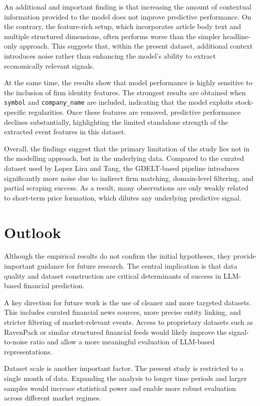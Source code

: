 An additional and important finding is that increasing the amount of contextual information provided to the model does not improve predictive performance. On the contrary, the feature-rich setup, which incorporates article body text and multiple structured dimensions, often performs worse than the simpler headline-only approach. This suggests that, within the present dataset, additional context introduces noise rather than enhancing the model’s ability to extract economically relevant signals.

At the same time, the results show that model performance is highly sensitive to the inclusion of firm identity features. The strongest results are obtained when \texttt{symbol} and \texttt{company\_name} are included, indicating that the model exploits stock-specific regularities. Once these features are removed, predictive performance declines substantially, highlighting the limited standalone strength of the extracted event features in this dataset.

Overall, the findings suggest that the primary limitation of the study lies not in the modelling approach, but in the underlying data. Compared to the curated dataset used by Lopez Lira and Tang, the GDELT-based pipeline introduces significantly more noise due to indirect firm matching, domain-level filtering, and partial scraping success. As a result, many observations are only weakly related to short-term price formation, which dilutes any underlying predictive signal.

\section{Outlook}

Although the empirical results do not confirm the initial hypotheses, they provide important guidance for future research. The central implication is that data quality and dataset construction are critical determinants of success in LLM-based financial prediction.

A key direction for future work is the use of cleaner and more targeted datasets. This includes curated financial news sources, more precise entity linking, and stricter filtering of market-relevant events. Access to proprietary datasets such as RavenPack or similar structured financial feeds would likely improve the signal-to-noise ratio and allow a more meaningful evaluation of LLM-based representations.

Dataset scale is another important factor. The present study is restricted to a single month of data. Expanding the analysis to longer time periods and larger samples would increase statistical power and enable more robust evaluation across different market regimes.

